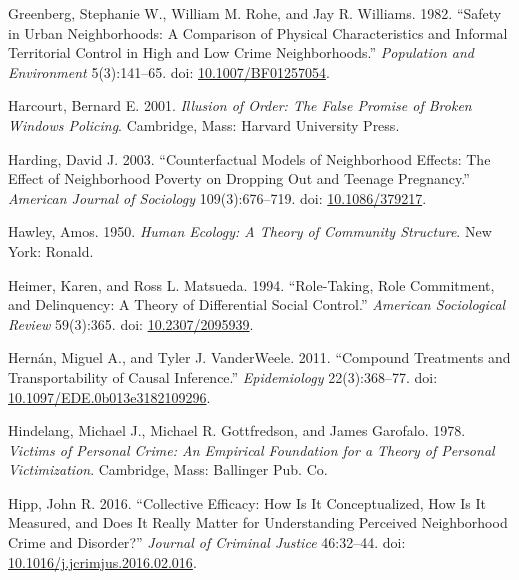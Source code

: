 \documentclass [11pt, proquest] {uwthesis}[2015/03/03]
\newlength{\cslhangindent}
\newenvironment{CSLReferences}[2]%
{\setlength{\parindent}{0pt}%
\everypar{\setlength{\hangindent}{\cslhangindent}}\ignorespaces}%
{\par}
\begin{document}
\begin{CSLReferences}{1}{0}
\leavevmode\hypertarget{ref-greenbergSafetyUrbanNeighborhoods1982}{}%
Greenberg, Stephanie W., William M. Rohe, and Jay R. Williams. 1982. {``Safety in {Urban Neighborhoods}: {A Comparison} of {Physical Characteristics} and {Informal Territorial Control} in {High} and {Low Crime Neighborhoods}.''} \emph{Population and Environment} 5(3):141--65. doi: \href{https://doi.org/10.1007/BF01257054}{10.1007/BF01257054}.

\leavevmode\hypertarget{ref-harcourtIllusionOrderFalse2001}{}%
Harcourt, Bernard E. 2001. \emph{Illusion of {Order}: {The False Promise} of {Broken Windows Policing}}. {Cambridge, Mass}: {Harvard University Press}.

\leavevmode\hypertarget{ref-hardingCounterfactualModelsNeighborhood2003}{}%
Harding, David J. 2003. {``Counterfactual {Models} of {Neighborhood Effects}: {The Effect} of {Neighborhood Poverty} on {Dropping Out} and {Teenage Pregnancy}.''} \emph{American Journal of Sociology} 109(3):676--719. doi: \href{https://doi.org/10.1086/379217}{10.1086/379217}.

\leavevmode\hypertarget{ref-hawleyHumanEcologyTheory1950}{}%
Hawley, Amos. 1950. \emph{Human {Ecology}: {A Theory} of {Community Structure}}. {New York}: {Ronald}.

\leavevmode\hypertarget{ref-heimerRoleTakingRoleCommitment1994}{}%
Heimer, Karen, and Ross L. Matsueda. 1994. {``Role-{Taking}, {Role Commitment}, and {Delinquency}: {A Theory} of {Differential Social Control}.''} \emph{American Sociological Review} 59(3):365. doi: \href{https://doi.org/10.2307/2095939}{10.2307/2095939}.

\leavevmode\hypertarget{ref-hernanCompoundTreatmentsTransportability2011}{}%
Hernán, Miguel A., and Tyler J. VanderWeele. 2011. {``Compound {Treatments} and {Transportability} of {Causal Inference}.''} \emph{Epidemiology} 22(3):368--77. doi: \href{https://doi.org/10.1097/EDE.0b013e3182109296}{10.1097/EDE.0b013e3182109296}.

\leavevmode\hypertarget{ref-hindelangVictimsPersonalCrime1978}{}%
Hindelang, Michael J., Michael R. Gottfredson, and James Garofalo. 1978. \emph{Victims of Personal Crime: An Empirical Foundation for a Theory of Personal Victimization}. {Cambridge, Mass}: {Ballinger Pub. Co}.

\leavevmode\hypertarget{ref-hippCollectiveEfficacyHow2016}{}%
Hipp, John R. 2016. {``Collective {Efficacy}: {How} Is It {Conceptualized}, {How} Is It {Measured}, and {Does} It {Really Matter} for {Understanding Perceived Neighborhood Crime} and {Disorder}?''} \emph{Journal of Criminal Justice} 46:32--44. doi: \href{https://doi.org/10.1016/j.jcrimjus.2016.02.016}{10.1016/j.jcrimjus.2016.02.016}.


\end{CSLReferences}
\end{document}
